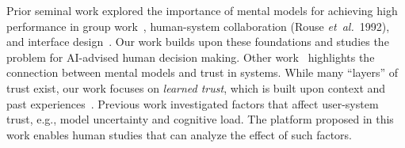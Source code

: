 \documentclass[letterpaper]{article} %
\newcommand{\bug}
    {\mbox{\rule{2mm}{2mm}}}
\newcommand{\Bug}[1]
    {\bug \footnote{BUG: {#1}}}
\newcommand{\etal}{\mbox{\it et al.}}
\newcommand{\?}{\mbox{?}}
\newcommand{\name}{AI-advised human decision making}
\begin{document}
Prior seminal work explored the importance of mental models for achieving high performance in group work~\cite{grosz1999evolution}, human-system collaboration (Rouse \etal\ 1992), and interface design~\cite{carroll1988mental}. Our work builds upon these foundations and studies the problem for \name.
Other work~\cite{hoff2015trust} highlights the connection between mental models and trust in systems.
While many ``layers'' of trust exist, our work focuses on {\em learned trust}, which is built upon context and past experiences~\cite{marsh2003role}.
Previous work \cite{zhou2017effects} investigated factors that affect user-system trust, e.g., model uncertainty and cognitive load. The platform proposed in this work enables human studies that can analyze the effect of such factors.

\end{document}
